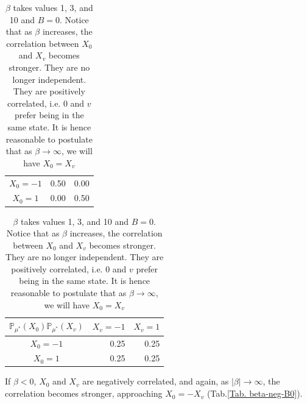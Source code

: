 \documentclass[12pt]{article}
\numberwithin{equation}{section}
\begin{document}
\begin{table}[h]
\begin{tabular}{c|rr}
        $X_0=-1$                       & 0.50                         & 0.00                        \\
        $X_0=1$                        & 0.00                         & 0.50
    \end{tabular}
    \quad\quad
    \begin{tabular}{c|rr}
        $\mathbb{P}_{\mu^*}(X_0)\mathbb{P}_{\mu^*}(X_v)$ & \multicolumn{1}{c}{$X_v=-1$} & \multicolumn{1}{c}{$X_v=1$} \\ \hline
        $X_0=-1$                                         & 0.25                         & 0.25                        \\
        $X_0=1$                                          & 0.25                         & 0.25
    \end{tabular}
    \caption{$\beta$ takes values 1, 3, and 10 and $B=0$. Notice that
        as $\beta$ increases, the correlation between $X_0$ and $X_v$ becomes stronger. They are no longer independent. They are positively correlated, i.e. $0$ and $v$ prefer being in the same
        state. It is hence reasonable to postulate that as $\beta\rightarrow\infty$, we will have $X_0=X_v$}
    \label{Tab. beta-higher-B0}
\end{table}

\noindent If $\beta < 0$, $X_0$ and $X_v$ are negatively correlated, and again, as $|\beta|\rightarrow \infty$, the correlation becomes stronger,
approaching $X_0=-X_v$ (Tab.\ref{Tab. beta-neg-B0}).
\end{document}
